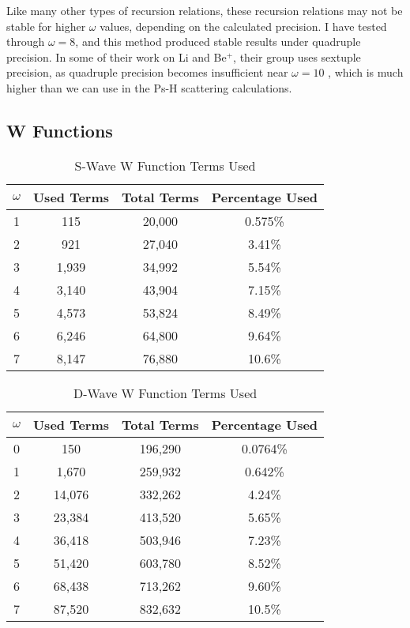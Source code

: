 \documentclass[Dissertation.tex]{subfiles}
\begin{document}
Like many other types of recursion relations, these recursion relations may not be stable for higher $\omega$ values, depending on the calculated precision. I have tested through $\omega = 8$, and this method produced stable results under quadruple precision. In some of their work on Li and Be$^+$, their group uses sextuple precision, as quadruple precision becomes insufficient near $\omega = 10$ \cite{Puchalski2006}, which is much higher than we can use in the Ps-H scattering calculations.




\subsection{W Functions}
\label{sec:WFunctions}

\begin{table}[H]
\centering
\begin{tabular}{c c c c}
\toprule
$\omega$ & Used Terms & Total Terms & Percentage Used \\
\midrule
1 & 	115   &  20,000 & 	0.575\% \\
2 & 	921   &  27,040 & 	3.41\% \\
3 & 	1,939 &  34,992 & 	5.54\% \\
4 & 	3,140 &  43,904 & 	7.15\% \\
5 & 	4,573 &  53,824 &	8.49\% \\
6 & 	6,246 &  64,800 &	9.64\% \\
7 & 	8,147 &  76,880 &	10.6\% \\
\bottomrule
\end{tabular}
\caption{S-Wave W Function Terms Used}
\label{tab:WFuncUnusedS}
\end{table}



\begin{table}[H]
\centering
\begin{tabular}{c c c c}
\toprule
$\omega$ & Used Terms & Total Terms & Percentage Used \\
\midrule
0 & 150		&	196,290 &	0.0764\% \\
1 & 1,670	&	259,932 &	0.642\% \\
2 & 14,076	&	332,262 &	4.24\% \\
3 & 23,384	&	413,520 &	5.65\% \\
4 & 36,418	&	503,946 &	7.23\% \\
5 & 51,420 &	603,780 &	8.52\% \\
6 & 68,438	&	713,262 &	9.60\% \\
7 & 87,520 &	832,632 &  10.5\% \\
\bottomrule
\end{tabular}
\caption{D-Wave W Function Terms Used}
\label{tab:WFuncUnusedD}
\end{table}
\end{document}
